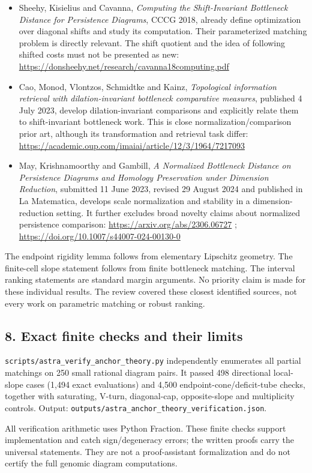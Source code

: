 \documentclass[
  11pt,
]{article}
\providecommand{\tightlist}{%
  \setlength{\itemsep}{0pt}\setlength{\parskip}{0pt}}
\begin{document}
\begin{itemize}
\tightlist
\item
  Sheehy, Kisielius and Cavanna, \emph{Computing the Shift-Invariant
  Bottleneck Distance for Persistence Diagrams}, CCCG 2018, already
  define optimization over diagonal shifts and study its computation.
  Their parameterized matching problem is directly relevant. The shift
  quotient and the idea of following shifted costs must not be presented
  as new: \url{https://donsheehy.net/research/cavanna18computing.pdf}
\item
  Cao, Monod, Vlontzos, Schmidtke and Kainz, \emph{Topological
  information retrieval with dilation-invariant bottleneck comparative
  measures}, published 4 July 2023, develop dilation-invariant
  comparisons and explicitly relate them to shift-invariant bottleneck
  work. This is close normalization/comparison prior art, although its
  transformation and retrieval task differ:
  \url{https://academic.oup.com/imaiai/article/12/3/1964/7217093}
\item
  May, Krishnamoorthy and Gambill, \emph{A Normalized Bottleneck
  Distance on Persistence Diagrams and Homology Preservation under
  Dimension Reduction}, submitted 11 June 2023, revised 29 August 2024
  and published in La Matematica, develops scale normalization and
  stability in a dimension-reduction setting. It further excludes broad
  novelty claims about normalized persistence comparison:
  \url{https://arxiv.org/abs/2306.06727} ;
  \url{https://doi.org/10.1007/s44007-024-00130-0}
\end{itemize}

The endpoint rigidity lemma follows from elementary Lipschitz geometry.
The finite-cell slope statement follows from finite bottleneck matching.
The interval ranking statements are standard margin arguments. No
priority claim is made for these individual results. The review covered
these closest identified sources, not every work on parametric matching
or robust ranking.

\subsection{8. Exact finite checks and their
limits}\label{exact-finite-checks-and-their-limits}

\nolinkurl{scripts/astra_verify_anchor_theory.py} independently
enumerates all partial matchings on 250 small rational diagram pairs. It
passed 498 directional local-slope cases (1,494 exact evaluations) and
4,500 endpoint-cone/deficit-tube checks, together with saturating,
V-turn, diagonal-cap, opposite-slope and multiplicity controls. Output:
\nolinkurl{outputs/astra_anchor_theory_verification.json}.

All verification arithmetic uses Python Fraction. These finite checks
support implementation and catch sign/degeneracy errors; the written
proofs carry the universal statements. They are not a proof-assistant
formalization and do not certify the full genomic diagram computations.
\end{document}
